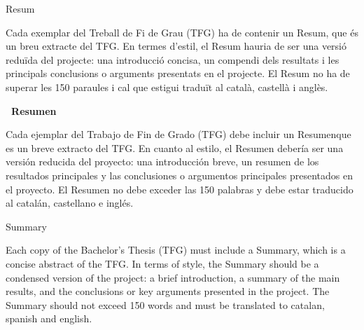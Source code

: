 

\begin{center}
  \huge\bfseries\raggedright Resum~\hrulefill
\end{center}
  Cada exemplar del Treball de Fi de Grau (TFG) ha de contenir un Resum, que és un breu extracte del TFG. En termes d'estil, el Resum hauria de ser una versió reduïda del projecte: una introducció concisa, un compendi dels resultats i les principals conclusions o arguments presentats en el projecte. El Resum no ha de superar les 150 paraules i cal que estigui traduït al català, castellà i anglès.

\begin{center}
  \huge\bfseries\raggedleft\vspace*{.5\baselineskip} \hrulefill ~Resumen
\end{center}
  Cada ejemplar del Trabajo de Fin de Grado (TFG) debe incluir un Resumenque es un breve extracto del TFG. En cuanto al estilo, el Resumen debería ser una versión reducida del proyecto: una introducción breve, un resumen de los resultados principales y las conclusiones o argumentos principales presentados en el proyecto. El Resumen no debe exceder las 150 palabras y debe estar traducido al catalán, castellano e inglés.

\begin{center}
  \huge\bfseries\raggedright\vspace*{.5\baselineskip} Summary~\hrulefill
\end{center}
  Each copy of the Bachelor's Thesis (TFG) must include a Summary, which is a concise abstract of the TFG. In terms of style, the Summary should be a condensed version of the project: a brief introduction, a summary of the main results, and the conclusions or key arguments presented in the project. The Summary should not exceed 150 words and must be translated to catalan, spanish and english.
